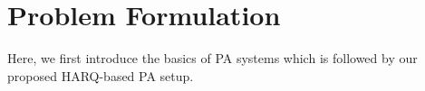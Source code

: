 



\section{Problem Formulation}

Here, we first introduce the basics of PA systems which is followed by our proposed HARQ-based PA setup.

